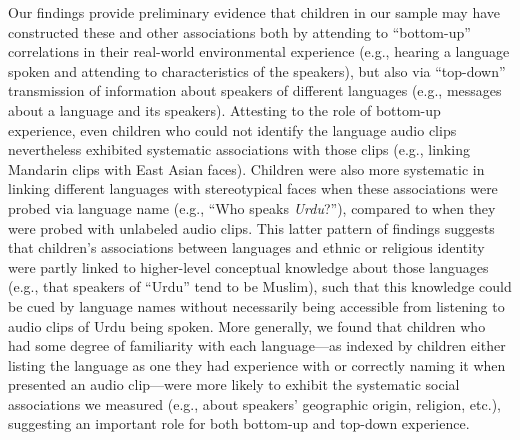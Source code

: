 \documentclass{foushee-adapted-preprint}
\begin{document}
Our findings provide preliminary evidence that children in our sample may have constructed these and other associations both by attending to ``bottom-up'' correlations in their real-world environmental experience (e.g., hearing a language spoken and attending to characteristics of the speakers), but also via ``top-down'' transmission of information about speakers of different languages (e.g., messages about a language and its speakers). 
Attesting to the role of bottom-up experience, even children who could not identify the language audio clips nevertheless exhibited systematic associations with those clips (e.g., linking Mandarin clips with East Asian faces). %
Children were also more systematic in linking different languages with stereotypical faces when these associations were probed via language name (e.g., ``Who speaks \textit{Urdu}?''), compared to when they were probed with unlabeled audio clips. This latter pattern of findings suggests that children's associations between languages and ethnic or religious identity were partly linked to higher-level conceptual knowledge about those languages (e.g., that speakers of ``Urdu'' tend to be Muslim), such that this knowledge could be cued by language names without necessarily being accessible from listening to audio clips of Urdu being spoken. 
More generally, we found that children who had some degree of familiarity with each language---as indexed by children either listing the language as one they had experience with or correctly naming it when presented an audio clip---were more likely to exhibit the systematic social associations we measured (e.g., about speakers' geographic origin, religion, etc.), suggesting an important role for both bottom-up and top-down experience.  %
\end{document}
